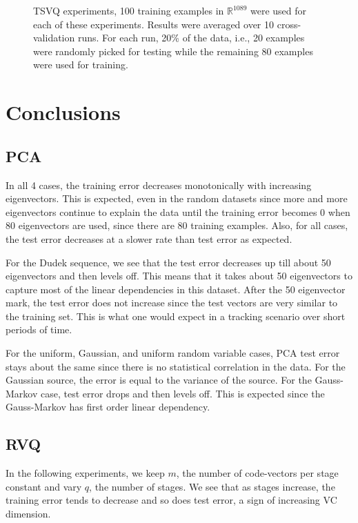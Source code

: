 \begin{figure}
\caption{TSVQ experiments, 100 training examples in $\mathbb{R}^{1089}$ were used for each of these experiments.  Results were averaged over 10 cross-validation runs.  For each run, 20\% of the data, i.e., 20 examples were randomly picked for testing while the remaining 80 examples were used for training.}
\label{fig:TSVQ_results}
\end{figure}


\section{Conclusions}
\subsection{PCA}
In all 4 cases, the training error decreases monotonically with increasing eigenvectors.  This is expected, even in the random datasets since more and more eigenvectors continue to explain the data until the training error becomes 0 when 80 eigenvectors are used, since there are 80 training examples.  Also, for all cases, the test error decreases at a slower rate than test error as expected. 

For the Dudek sequence, we see that the test error decreases up till about 50 eigenvectors and then levels off.  This means that it takes about 50 eigenvectors to capture most of the linear dependencies in this dataset.  After the 50 eigenvector mark, the test error does not increase since the test vectors are very similar to the training set.  This is what one would expect in a tracking scenario over short periods of time.  

For the uniform, Gaussian, and uniform random variable cases, PCA test error stays about the same since there is no statistical correlation in the data.  For the Gaussian source, the error is equal to the variance of the source.  For the Gauss-Markov case, test error drops and then levels off.  This is expected since the Gauss-Markov has first order linear dependency.

\subsection{RVQ}
In the following experiments, we keep $m$, the number of code-vectors per stage constant and vary $q$, the number of stages.  We see that as stages increase, the training error tends to decrease and so does test error, a sign of increasing VC dimension.

